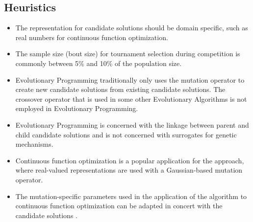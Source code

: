 \subsection{Heuristics}
\begin{itemize}
	\item The representation for candidate solutions should be domain specific, such as real numbers for continuous function optimization.
	\item The sample size (bout size) for tournament selection during competition is commonly between 5\% and 10\% of the population size.
	\item Evolutionary Programming traditionally only uses the mutation operator to create new candidate solutions from existing candidate solutions. The crossover operator that is used in some other Evolutionary Algorithms is not employed in Evolutionary Programming.
	\item Evolutionary Programming is concerned with the linkage between parent and child candidate solutions and is not concerned with surrogates for genetic mechanisms.
	\item Continuous function optimization is a popular application for the approach, where real-valued representations are used  with a Gaussian-based mutation operator.
	\item The mutation-specific parameters used in the application of the algorithm to continuous function optimization can be adapted in concert with the candidate solutions \cite{Fogel1991a}.
\end{itemize}

